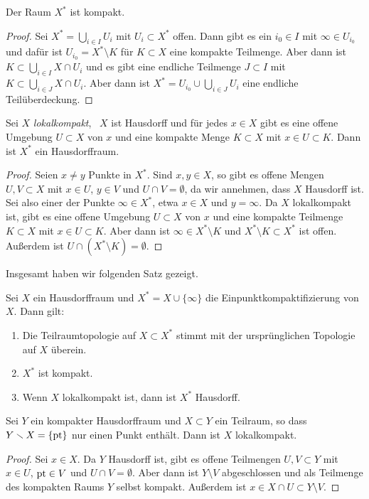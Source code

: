 \begin{lemma}
Der Raum $X^*$ ist kompakt.
\end{lemma}
\begin{proof}
Sei $X^* = \bigcup_{i\in I} U_i$ mit $U_i\subset X^*$ offen. Dann gibt es ein $i_0\in I$ mit $\infty\in U_{i_0}$ und dafür ist $U_{i_0} = X^*\setminus K$ für $K\subset X$ eine kompakte Teilmenge. Aber dann ist $K\subset \bigcup_{i\in I} X\cap U_i$ und es gibt eine endliche Teilmenge $J\subset I$ mit $K\subset \bigcup_{i\in J} X\cap U_i$. Aber dann ist $X^* = U_{i_0}\cup \bigcup_{i\in J} U_i$ eine endliche Teilüberdeckung.
\end{proof}

\begin{lemma}
Sei $X$ \emph{lokalkompakt}, \ddh~$X$ ist Hausdorff und für jedes $x\in X$ gibt es eine offene Umgebung $U\subset X$ von $x$ und eine kompakte Menge $K\subset X$ mit $x\in U\subset K$. Dann ist $X^*$ ein Hausdorffraum.
\end{lemma}
\begin{proof}
Seien $x\neq y$ Punkte in $X^*$. Sind $x,y\in X$, so gibt es offene Mengen $U,V\subset X$ mit $x\in U$, $y\in V$ und $U\cap V = \emptyset$, da wir annehmen, dass $X$ Hausdorff ist. Sei also einer der Punkte $\infty\in X^*$, etwa $x\in X$ und $y=\infty$. Da $X$ lokalkompakt ist, gibt es eine offene Umgebung $U\subset X$ von $x$ und eine kompakte Teilmenge $K\subset X$ mit $x\in U\subset K$. Aber dann ist $\infty\in X^*\setminus K$ und $X^*\setminus K\subset X^*$ ist offen. Außerdem ist $U\cap(X^*\setminus K) = \emptyset$.
\end{proof}

Insgesamt haben wir folgenden Satz gezeigt.
\begin{theorem}
Sei $X$ ein Hausdorffraum und $X^* = X\cup\{\infty\}$ die Einpunktkompaktifizierung von $X$. Dann gilt:
\begin{enumerate}
\item Die Teilraumtopologie auf $X\subset X^*$ stimmt mit der ursprünglichen Topologie auf $X$ überein.
\item $X^*$ ist kompakt.
\item Wenn $X$ lokalkompakt ist, dann ist $X^*$ Hausdorff.
\end{enumerate}
\end{theorem}

\begin{lemma}\label{lem:loccomp-compactification-hausdorff}
Sei $Y$ ein kompakter Hausdorffraum und $X\subset Y$ ein Teilraum, so dass $Y\setminus X = \{\pt\}$ nur einen Punkt enthält. Dann ist $X$ lokalkompakt.
\end{lemma}
\begin{proof}
Sei $x\in X$. Da $Y$ Hausdorff ist, gibt es offene Teilmengen $U,V\subset Y$ mit $x\in U$, $\operatorname{\textnormal{pt}}\in V$ und $U\cap V = \emptyset$. Aber dann ist $Y\setminus V$ abgeschlossen und als Teilmenge des kompakten Raums $Y$ selbst kompakt. Außerdem ist $x\in X\cap U\subset Y\setminus V$.
\end{proof}

